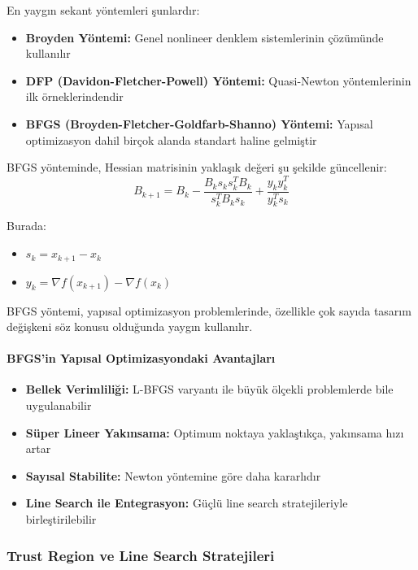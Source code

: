 En yaygın sekant yöntemleri şunlardır:
\begin{itemize}
    \item \textbf{Broyden Yöntemi:} Genel nonlineer denklem sistemlerinin çözümünde kullanılır
    \item \textbf{DFP (Davidon-Fletcher-Powell) Yöntemi:} Quasi-Newton yöntemlerinin ilk örneklerindendir
    \item \textbf{BFGS (Broyden-Fletcher-Goldfarb-Shanno) Yöntemi:} Yapısal optimizasyon dahil birçok alanda standart haline gelmiştir
\end{itemize}

BFGS yönteminde, Hessian matrisinin yaklaşık değeri şu şekilde güncellenir:
\begin{equation}
B_{k+1} = B_k - \frac{B_k s_k s_k^T B_k}{s_k^T B_k s_k} + \frac{y_k y_k^T}{y_k^T s_k}
\end{equation}

Burada:
\begin{itemize}
    \item $s_k = x_{k+1} - x_k$
    \item $y_k = \nabla f(x_{k+1}) - \nabla f(x_k)$
\end{itemize}

BFGS yöntemi, yapısal optimizasyon problemlerinde, özellikle çok sayıda tasarım değişkeni söz konusu olduğunda yaygın kullanılır.

\paragraph{BFGS'in Yapısal Optimizasyondaki Avantajları}
\begin{itemize}
    \item \textbf{Bellek Verimliliği:} L-BFGS varyantı ile büyük ölçekli problemlerde bile uygulanabilir
    \item \textbf{Süper Lineer Yakınsama:} Optimum noktaya yaklaştıkça, yakınsama hızı artar
    \item \textbf{Sayısal Stabilite:} Newton yöntemine göre daha kararlıdır
    \item \textbf{Line Search ile Entegrasyon:} Güçlü line search stratejileriyle birleştirilebilir
\end{itemize}

\subsubsection{Trust Region ve Line Search Stratejileri}

